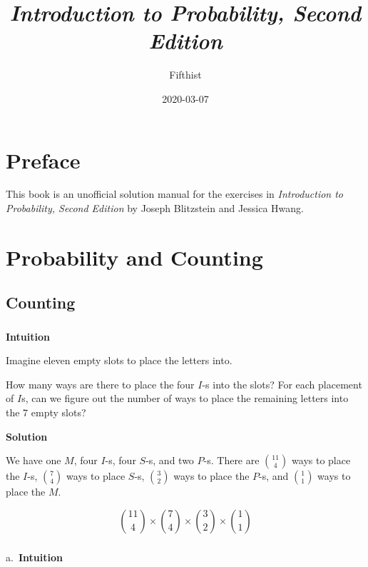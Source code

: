 \documentclass[]{book}
\title{\emph{Introduction to Probability, Second Edition}}
\author{Fifthist}
\date{2020-03-07}
\begin{document}
\maketitle

{
\setcounter{tocdepth}{1}
\tableofcontents
}
\chapter*{Preface}\label{preface}

This book is an unofficial solution manual for the exercises in
\emph{Introduction to Probability, Second Edition} by Joseph Blitzstein
and Jessica Hwang.

\chapter{Probability and Counting}\label{probability-and-counting}

\section{Counting}\label{counting}

\subsection{}\label{section}

\textbf{Intuition}

Imagine eleven empty slots to place the letters into.

How many ways are there to place the four \(I\)-s into the slots? For
each placement of \(I\)s, can we figure out the number of ways to place
the remaining letters into the \(7\) empty slots?

 \textbf{Solution}

We have one \(M\), four \(I\)-s, four \(S\)-s, and two \(P\)-s. There
are \({11 \choose 4}\) ways to place the \(I\)-s, \({7 \choose 4}\) ways
to place \(S\)-s, \({3 \choose 2}\) ways to place the \(P\)-s, and
\({1 \choose 1}\) ways to place the \(M\).

\[ {11 \choose 4} \times {7 \choose 4} \times {3 \choose 2} \times {1 \choose 1} \]

\subsection{}\label{section-1}

a.~\textbf{Intuition}
\end{document}
